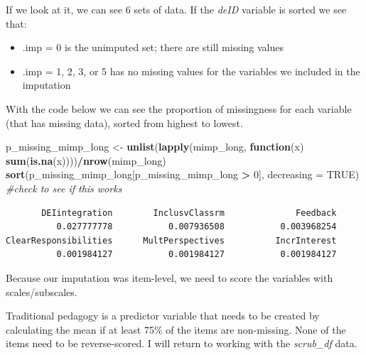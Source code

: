 \documentclass[
  11pt,
]{book}
\newenvironment{Shaded}{\begin{snugshade}}{\end{snugshade}}
\newcommand{\AttributeTok}[1]{\textcolor[rgb]{0.27,0.27,0.27}{#1}}
\newcommand{\CommentTok}[1]{\textcolor[rgb]{0.37,0.37,0.37}{\textit{#1}}}
\newcommand{\ConstantTok}[1]{\textcolor[rgb]{0.37,0.37,0.37}{#1}}
\newcommand{\ControlFlowTok}[1]{\textcolor[rgb]{0.27,0.27,0.27}{\textbf{#1}}}
\newcommand{\DecValTok}[1]{\textcolor[rgb]{0.06,0.06,0.06}{#1}}
\newcommand{\FunctionTok}[1]{\textcolor[rgb]{0.27,0.27,0.27}{\textbf{#1}}}
\newcommand{\NormalTok}[1]{#1}
\newcommand{\OtherTok}[1]{\textcolor[rgb]{0.37,0.37,0.37}{#1}}
\newcommand{\SpecialCharTok}[1]{\textcolor[rgb]{0.43,0.43,0.43}{\textbf{#1}}}
\providecommand{\tightlist}{%
  \setlength{\itemsep}{0pt}\setlength{\parskip}{0pt}}
\begin{document}
If we look at it, we can see 6 sets of data. If the \emph{deID} variable is sorted we see that:

\begin{itemize}
\tightlist
\item
  .imp = 0 is the unimputed set; there are still missing values
\item
  .imp = 1, 2, 3, or 5 has no missing values for the variables we included in the imputation
\end{itemize}

With the code below we can see the proportion of missingness for each variable (that has missing data), sorted from highest to lowest.

\begin{Shaded}
\begin{Highlighting}[]
\NormalTok{p\_missing\_mimp\_long }\OtherTok{\textless{}{-}} \FunctionTok{unlist}\NormalTok{(}\FunctionTok{lapply}\NormalTok{(mimp\_long, }\ControlFlowTok{function}\NormalTok{(x) }\FunctionTok{sum}\NormalTok{(}\FunctionTok{is.na}\NormalTok{(x))))}\SpecialCharTok{/}\FunctionTok{nrow}\NormalTok{(mimp\_long)}
\FunctionTok{sort}\NormalTok{(p\_missing\_mimp\_long[p\_missing\_mimp\_long }\SpecialCharTok{\textgreater{}} \DecValTok{0}\NormalTok{], }\AttributeTok{decreasing =} \ConstantTok{TRUE}\NormalTok{)  }\CommentTok{\#check to see if this works}
\end{Highlighting}
\end{Shaded}

\begin{verbatim}
       DEIintegration        InclusvClassrm              Feedback 
          0.027777778           0.007936508           0.003968254 
ClearResponsibilities      MultPerspectives          IncrInterest 
          0.001984127           0.001984127           0.001984127 
\end{verbatim}

Because our imputation was item-level, we need to score the variables with scales/subscales.

Traditional pedagogy is a predictor variable that needs to be created by calculating the mean if at least 75\% of the items are non-missing. None of the items need to be reverse-scored. I will return to working with the \emph{scrub\_df} data.
\end{document}
